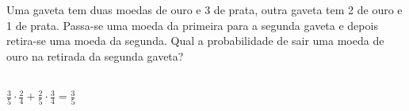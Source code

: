 \begin{ex}
 Uma gaveta tem duas moedas de ouro e 3 de prata, outra gaveta tem 2 de ouro e 1 de  prata. Passa-se uma moeda da primeira para a segunda gaveta e depois retira-se uma moeda da segunda. Qual a probabilidade de sair uma moeda de ouro na retirada da segunda gaveta?
   \begin{sol}
    \phantom{A} \\
      $\frac{3}{5}\cdot\frac{2}{4}+\frac{2}{5}\cdot\frac{3}{4}=\frac{3}{5}$
   \end{sol}
\end{ex}
